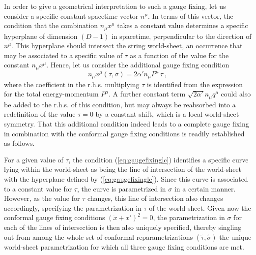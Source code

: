 \documentclass[a4paper,11pt]{article}
\begin{document}
In order to give a geometrical interpretation to such a gauge fixing,
let us consider a specific constant spacetime vector $n^\mu$. In terms
of this vector, the condition that the combination $n_\mu x^\mu$ takes
a constant value determines a specific hyperplane of dimension $(D-1)$
in spacetime, perpendicular to the direction of $n^\mu$. This hyperplane
should intersect the string world-sheet, an occurrence that may be associated
to a specific value of $\tau$ as a function of the value for the constant
$n_\mu x^\mu$. Hence, let us consider the additional gauge fixing condition
\begin{equation}
n_\mu x^\mu(\tau,\sigma)=2\alpha' n_\mu P^\mu\,\tau\ ,
\label{eq:gaugefixinglc}
\end{equation}
where the coefficient in the r.h.s. multiplying $\tau$ is identified
from the expression for the total energy-momentum $P^\mu$.
A further constant term $\sqrt{2\alpha'}n_\mu q^\mu$ could also be added
to the r.h.s. of this condition, but may always be reabsorbed into
a redefinition of the value $\tau=0$ by a constant shift, which is
a local world-sheet symmetry. That this additional condition indeed leads
to a complete gauge fixing in combination with the conformal gauge fixing
conditions is readily established as follows.

For a given value of $\tau$, the condition (\ref{eq:gaugefixinglc})
identifies a specific curve lying within the world-sheet as being the
line of intersection of the world-sheet with the hyperplane defined
by (\ref{eq:gaugefixinglc}). Since this curve is associated to a constant
value for $\tau$, the curve is parametrized in $\sigma$ in a certain manner. 
However, as the value for $\tau$ changes, this line of intersection also 
changes accordingly, specifying the parametrization in $\tau$ of the 
world-sheet. Given now the conformal gauge fixing conditions 
$(\dot{x}+x')^2=0$, the parametrization in $\sigma$ for each of the lines
of intersection is then also uniquely specified, thereby singling out from
among the whole set of conformal reparametrizations 
$(\tilde{\tau},\tilde{\sigma})$ the unique world-sheet parametrization
for which all three gauge fixing conditions are met.
\end{document}
